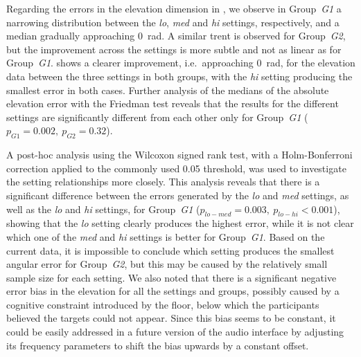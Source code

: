 \documentclass[]{interact}
\begin{document}
Regarding the errors in the elevation dimension in , we observe in Group~\textit{G1} a narrowing distribution between the \textit{lo}, \textit{med} and \textit{hi} settings, respectively, and a median gradually approaching \SI{0}{\radian}.
A similar trent is observed for Group~\textit{G2}, but the improvement across the settings is more subtle and not as linear as for Group~\textit{G1}.
 shows a clearer improvement, i.e.\ approaching \SI{0}{\radian}, for the elevation data between the three settings in both groups, with the \textit{hi} setting producing the smallest error in both cases.
Further analysis of the medians of the absolute elevation error with the Friedman test reveals that the results for the different settings are significantly different from each other only for Group~\textit{G1} ($p_{G1} = 0.002,~p_{G2} = 0.32$).

A post-hoc analysis using the Wilcoxon signed rank test, with a Holm-Bonferroni correction applied to the commonly used 0.05 threshold, was used to investigate the setting relationships more closely. 
This analysis reveals that there is a significant difference between the errors generated by the \textit{lo} and \textit{med} settings, as well as the \textit{lo} and \textit{hi} settings, for Group~\textit{G1} ($p_{lo-med} = 0.003,~p_{lo-hi} < 0.001$), showing that the \textit{lo} setting clearly produces the highest error, while it is not clear which one of the \textit{med} and \textit{hi} settings is better for Group~\textit{G1}. 
Based on the current data, it is impossible to conclude which setting produces the smallest angular error for Group~\textit{G2}, but this may be caused by the relatively small sample size for each setting. 
We also noted that there is a significant negative error bias in the elevation for all the settings and groups, possibly caused by a cognitive constraint introduced by the floor, below which the participants believed the targets could not appear.
Since this bias seems to be constant, it could be easily addressed in a future version of the audio interface by adjusting its frequency parameters to shift the bias upwards by a constant offset. 
\end{document}
